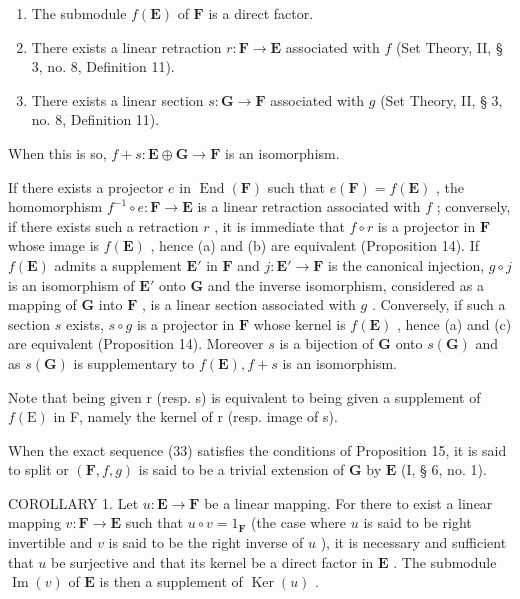 \begin{enumerate}
\def\labelenumi{(\alph{enumi})}
\item
  The submodule \(f(\mathbf{E})\) of \(\mathbf{F}\) is a direct factor.
\item
  There exists a linear retraction \(r: \mathbf{F} \to \mathbf{E}\) associated with \(f\) (Set Theory, II, § 3, no. 8, Definition 11).
\item
  There exists a linear section \(s: \mathbf{G} \to \mathbf{F}\) associated with \(g\) (Set Theory, II, § 3, no. 8, Definition 11).
\end{enumerate}

When this is so, \(f + s: \mathbf{E} \oplus \mathbf{G} \to \mathbf{F}\) is an isomorphism.

If there exists a projector \(e\) in \(\operatorname{End}(\mathbf{F})\) such that \(e(\mathbf{F}) = f(\mathbf{E})\) , the homomorphism \(f^{-1} \circ e: \mathbf{F} \to \mathbf{E}\) is a linear retraction associated with \(f\) ; conversely, if there exists such a retraction \(r\) , it is immediate that \(f \circ r\) is a projector in \(\mathbf{F}\) whose image is \(f(\mathbf{E})\) , hence (a) and (b) are equivalent (Proposition 14). If \(f(\mathbf{E})\) admits a supplement \(\mathbf{E}'\) in \(\mathbf{F}\) and \(j: \mathbf{E}' \to \mathbf{F}\) is the canonical injection, \(g \circ j\) is an isomorphism of \(\mathbf{E}'\) onto \(\mathbf{G}\) and the inverse isomorphism, considered as a mapping of \(\mathbf{G}\) into \(\mathbf{F}\) , is a linear section associated with \(g\) . Conversely, if such a section \(s\) exists, \(s \circ g\) is a projector in \(\mathbf{F}\) whose kernel is \(f(\mathbf{E})\) , hence (a) and (c) are equivalent (Proposition 14). Moreover \(s\) is a bijection of \(\mathbf{G}\) onto \(s(\mathbf{G})\) and as \(s(\mathbf{G})\) is supplementary to \(f(\mathbf{E}), f + s\) is an isomorphism.

Note that being given r (resp. s) is equivalent to being given a supplement of \(f(\mathrm{E})\) in F, namely the kernel of r (resp. image of s).

When the exact sequence (33) satisfies the conditions of Proposition 15, it is said to split or \((\mathbf{F}, f, g)\) is said to be a trivial extension of \(\mathbf{G}\) by \(\mathbf{E}\) (I, § 6, no. 1).

COROLLARY 1. Let \(u: \mathbf{E} \to \mathbf{F}\) be a linear mapping. For there to exist a linear mapping \(v: \mathbf{F} \to \mathbf{E}\) such that \(u \circ v = 1_{\mathbf{F}}\) (the case where \(u\) is said to be right invertible and \(v\) is said to be the right inverse of \(u\) ), it is necessary and sufficient that \(u\) be surjective and that its kernel be a direct factor in \(\mathbf{E}\) . The submodule \(\operatorname{Im}(v)\) of \(\mathbf{E}\) is then a supplement of \(\operatorname{Ker}(u)\) .

